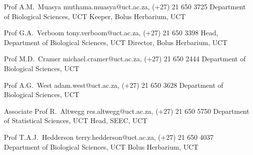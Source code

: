 \documentclass[10pt]{article}
\begin{document}
\begin{hangparas}{2em}{1}

Prof A.M.~Muasya         \hfill muthama.muasya@uct.ac.za, (+27) 21 650 3725 \break
Department of Biological Sciences, UCT \break
Keeper, Bolus Herbarium, UCT

Prof G.A.~Verboom
                           \hfill tony.verboom@uct.ac.za, (+27) 21 650 3398 \break
Head, Department of Biological Sciences, UCT \break
Director, Bolus Herbarium, UCT

Prof M.D.~Cramer         \hfill michael.cramer@uct.ac.za, (+27) 21 650 2444 \break
Department of Biological Sciences, UCT

Prof A.G.~West                \hfill adam.west@uct.ac.za, (+27) 21 650 3628 \break
Department of Biological Sciences, UCT

Associate Prof R.~Altwegg   \hfill res.altwegg@uct.ac.za, (+27) 21 650 5750 \break
Department of Statistical Sciences, UCT \break
Head, SEEC, UCT

Prof T.A.J.~Hedderson   \hfill terry.hedderson@uct.ac.za, (+27) 21 650 4037 \break
Department of Biological Sciences, UCT \break
Bolus Herbarium, UCT

\end{hangparas}
\end{document}
